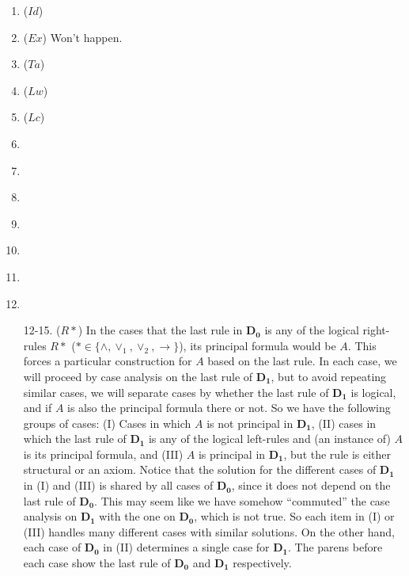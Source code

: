 \begin{enumerate}
	\item ($Id$) \label{c:id-*} 

	\item ($Ex$) Won't happen.

	\item ($Ta$) \label{c:ta-*} 

	\item ($Lw$) \label{c:lw-*} 

	\item ($Lc$) \label{c:lc-*} 

	\item \label{c:cut-*} 

	\item \label{c:la1-*} 

	\item \label{c:la2-*} 
	
	\item \label{c:lo-*} 
	
	
	\item \label{c:li-*} 
	
	\item \label{c:rw-*} 
	
	\item \label{c:ln-*} 


	\item[12-15.] ($R*$) In the cases that the last rule in $\mathbf{D_0}$ is any of the logical right-rules $R*$ ($* \in \{ \land, \lor_1, \lor_2, \rightarrow\}$), its principal formula would be $A$. This forces a particular construction for $A$ based on the last rule. In each case, we will proceed by case analysis on the last rule of $\mathbf{D_1}$, but to avoid repeating similar cases, we will separate cases by whether the last rule of $\mathbf{D_1}$ is logical, and if $A$ is also the principal formula there or not. So we have the following groups of cases:
	(I) Cases in which $A$ is not principal in $\mathbf{D_1}$,
	(II) cases in which the last rule of $\mathbf{D_1}$ is any of the logical left-rules and (an instance of) $A$ is its principal formula, and (III) $A$ is principal in $\mathbf{D_1}$, but the rule is either structural or an axiom. Notice that the solution for the different cases of $\mathbf{D_1}$ in (I) and (III) is shared by all cases of $\mathbf{D_0}$, since it does not depend on the last rule of $\mathbf{D_0}$. This may seem like we have somehow ``commuted'' the case analysis on $\mathbf{D_1}$ with the one on $\mathbf{D_0}$, which is not true. So each item in (I) or (III) handles many different cases with similar solutions.
	On the other hand, each case of $\mathbf{D_0}$ in (II) determines a single case for $\mathbf{D_1}$. The parens before each case show the last rule of $\mathbf{D_0}$ and $\mathbf{D_1}$ respectively.



\end{enumerate}
